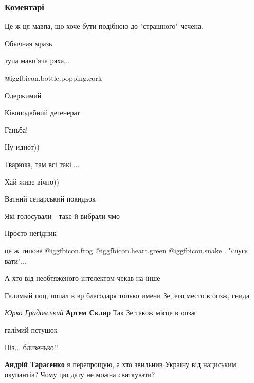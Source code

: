  
 
 
 
 
\subsubsection{Коментарі}

\begin{itemize} %
Це ж ця мавпа, що хоче бути подібною до "страшного" чечена.

Обычная мразь

тупа мавп'яча ряха...

 @igg{fbicon.bottle.popping.cork} 

Одержимий

Ківоподвбний дегенерат

Ганьба!

Ну идиот))

Тварюка, там всі такі....

Хай живе вічно))

Ватний сепарський покидьок

Які голосували - таке й вибрали чмо

Просто негідник

це ж типове  @igg{fbicon.frog}  @igg{fbicon.heart.green}  @igg{fbicon.snake}  . "слуга вати"...

А хто від необтяженого інтелектом чекав на інше

Галимый поц, попал в вр благодаря только имени Зе, его место в опзж, гнида

\emph{Юрко Градовський}
\textbf{Артем Скляр} Так Зе також місце в опзж

галімий пєтушок

Піз... близенько!!

\textbf{Андрій Тарасенко} я перепрощую, а хто звильнив Україну від нациським окупантів? Чому цю дату не можна святкувати?


\end{itemize}
